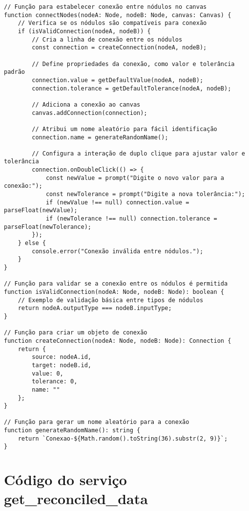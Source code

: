 \begin{verbatim}
// Função para estabelecer conexão entre nódulos no canvas
function connectNodes(nodeA: Node, nodeB: Node, canvas: Canvas) {
    // Verifica se os nódulos são compatíveis para conexão
    if (isValidConnection(nodeA, nodeB)) {
        // Cria a linha de conexão entre os nódulos
        const connection = createConnection(nodeA, nodeB);

        // Define propriedades da conexão, como valor e tolerância padrão
        connection.value = getDefaultValue(nodeA, nodeB);
        connection.tolerance = getDefaultTolerance(nodeA, nodeB);

        // Adiciona a conexão ao canvas
        canvas.addConnection(connection);

        // Atribui um nome aleatório para fácil identificação
        connection.name = generateRandomName();

        // Configura a interação de duplo clique para ajustar valor e tolerância
        connection.onDoubleClick(() => {
            const newValue = prompt("Digite o novo valor para a conexão:");
            const newTolerance = prompt("Digite a nova tolerância:");
            if (newValue !== null) connection.value = parseFloat(newValue);
            if (newTolerance !== null) connection.tolerance = parseFloat(newTolerance);
        });
    } else {
        console.error("Conexão inválida entre nódulos.");
    }
}

// Função para validar se a conexão entre os nódulos é permitida
function isValidConnection(nodeA: Node, nodeB: Node): boolean {
    // Exemplo de validação básica entre tipos de nódulos
    return nodeA.outputType === nodeB.inputType;
}

// Função para criar um objeto de conexão
function createConnection(nodeA: Node, nodeB: Node): Connection {
    return {
        source: nodeA.id,
        target: nodeB.id,
        value: 0,
        tolerance: 0,
        name: ""
    };
}

// Função para gerar um nome aleatório para a conexão
function generateRandomName(): string {
    return `Conexao-${Math.random().toString(36).substr(2, 9)}`;
}
\end{verbatim}


\chapter{Código do serviço get\_reconciled\_data}
\label{Anexo:CodigoFunctionGetReconciledData}

